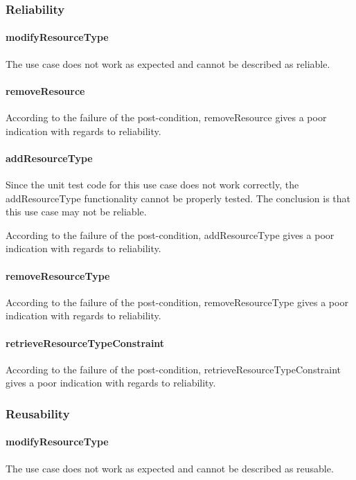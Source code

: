 \documentclass[a4paper]{article}
\begin{document}
\subsubsection {Reliability}

\paragraph{modifyResourceType}
The use case does not work as expected and cannot be described as reliable.

\paragraph{removeResource}
According to the failure of the post-condition, removeResource gives a poor indication with regards to reliability.

\paragraph{addResourceType}

Since the unit test code for this use case does not work correctly, 
the addResourceType functionality cannot be properly tested.
The conclusion is that this use case may not be reliable. 

According to the failure of the post-condition, addResourceType gives a poor indication with regards to reliability.

\paragraph{removeResourceType}
According to the failure of the post-condition, removeResourceType gives a poor indication with regards to reliability.

\paragraph{retrieveResourceTypeConstraint}
According to the failure of the post-condition, retrieveResourceTypeConstraint gives a poor indication with regards to reliability.


\subsubsection {Reusability}

\paragraph{modifyResourceType}
The use case does not work as expected and cannot be described as reusable.
\end{document}
